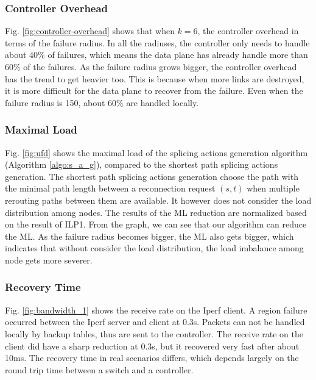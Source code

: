 \documentclass[10pt,journal]{IEEEtran}
\begin{document}
\subsubsection{Controller Overhead}
Fig. \ref{fig:controller-overhead} shows that when $k=6$, the controller overhead in terms of the failure radius. In all the radiuses, the controller only needs to handle about $40\%$ of failures, which means the data plane has already handle more than $60\%$ of the failures. As the failure radius grows bigger, the controller overhead has the trend to get heavier too. This is because when more links are destroyed, it is more difficult for the data plane to recover from the failure. Even when the failure radius is 150, about $60\%$ are handled locally.
\subsubsection{Maximal Load}
Fig. \ref{fig:ufd} shows the maximal load of the splicing actions generation algorithm (Algorithm \ref{algo:s_a_g}), compared to the shortest path splicing actions generation. The shortest path splicing actions generation choose the path with the minimal path length between a reconnection request $(s, t)$ when multiple rerouting paths between them are available\cite{xie2014designing}. It however does not consider the load distribution among nodes. The results of the ML reduction are normalized based on the result of ILP1. From the graph, we can see that our algorithm can reduce the ML. As the failure radius becomes bigger, the ML also gets bigger, which indicates that without consider the load distribution, the load imbalance among node gets more severer.
\subsubsection{Recovery Time}
Fig. \ref{fig:bandwidth_1} shows the receive rate on the Iperf client. A region failure occurred between the Iperf server and client at 0.3s. Packets can not be handled locally by backup tables, thus are sent to the controller. The receive rate on the client did have a sharp reduction at 0.3s, but it recovered very fast after about 10ms. The recovery time in real scenarios differs, which depends largely on the round trip time between a switch and a controller.
\end{document}
